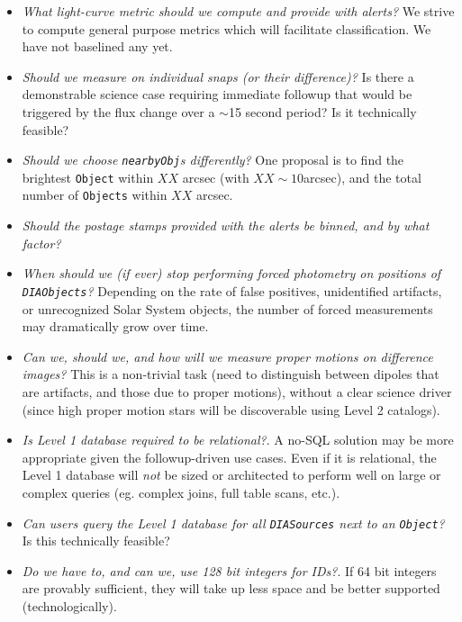 \documentclass[12pt]{article}
\newcommand{\code}[1]{\texttt{#1}}
\newcommand{\DIASources}{\code{DIASources}\xspace}
\newcommand{\DIAObjects}{\code{DIAObjects}\xspace}
\newcommand{\DB}{{Level 1 database}\xspace}
\newcommand{\Object}{\code{Object}\xspace}
\newcommand{\Objects}{\code{Objects}\xspace}
\begin{document}
\begin{itemize}
\item {\em What light-curve metric should we compute and provide with alerts?}
      We strive to compute general purpose metrics which will facilitate
      classification. We have not baselined any yet.
\item {\em Should we measure on individual snaps (or their difference)?} Is
      there a demonstrable science case requiring immediate followup that
      would be triggered by the flux change over a $\sim$15 second period? Is
      it technically feasible?
\item {\em Should we choose {\tt nearbyObj}s differently?} One proposal is to
      find the brightest \Object within $XX$ arcsec (with $XX \sim 10$arcsec),
      and the total number of \Objects within $XX$ arcsec.
\item {\em Should the postage stamps provided with the alerts be binned, and
      by what factor?}
\item {\em When should we (if ever) stop performing forced photometry on
      positions of \DIAObjects?} Depending on the rate of false positives,
      unidentified artifacts, or unrecognized Solar System objects, the number
      of forced measurements may dramatically grow over time.
\item {\em Can we, should we, and how will we measure proper motions on
      difference images?} This is a non-trivial task (need to distinguish
      between dipoles that are artifacts, and those due to proper motions),
      without a clear science driver (since high proper motion stars will be
      discoverable using Level 2 catalogs).
\item {\em Is \DB required to be relational?}. A no-SQL solution may be more
      appropriate given the followup-driven use cases. Even if it is
      relational, the Level 1 database will {\em not} be sized or architected
      to perform well on large or complex queries (eg. complex joins, full
      table scans, etc.).
\item {\em Can users query the \DB for all \DIASources next to an \Object?} Is
      this technically feasible?
\item {\em Do we have to, and can we, use 128 bit integers for IDs?}. If 64
      bit integers are provably sufficient, they will take up less space and
      be better supported (technologically).
\end{itemize}

\clearpage
\end{document}
